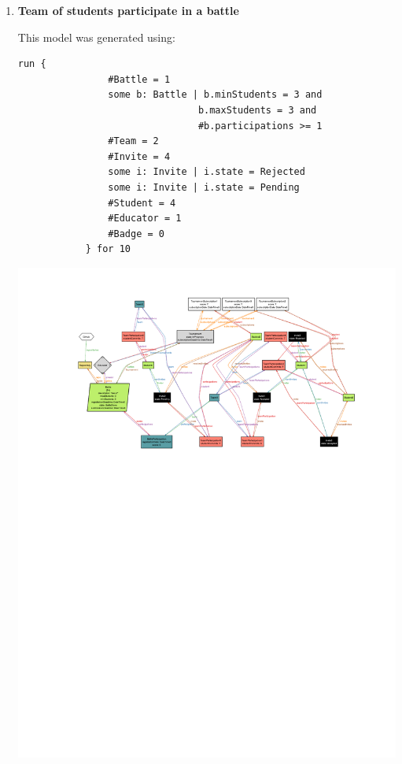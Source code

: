 \begin{enumerate}[label=,leftmargin=0cm]
      \item \textbf{Team of students participate in a battle}

            This model was generated using:
            \begin{lstlisting}[language=alloy]
            run {
                #Battle = 1 
                some b: Battle | b.minStudents = 3 and 
                                b.maxStudents = 3 and 
                                #b.participations >= 1
                #Team = 2
                #Invite = 4
                some i: Invite | i.state = Rejected
                some i: Invite | i.state = Pending
                #Student = 4
                #Educator = 1
                #Badge = 0
            } for 10
          \end{lstlisting}

            \begin{adjustbox}{max size={\textwidth}{\textheight}}
                  \includegraphics[trim=90 475 60 40, clip]{alloy/invites.pdf}
            \end{adjustbox}


\end{enumerate}

